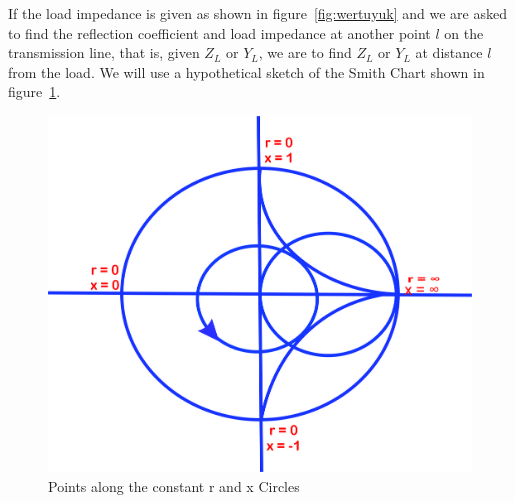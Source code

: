 If the load impedance is given as shown in figure~\ref{fig:wertuyuk} and we are asked to find the reflection coefficient and load impedance at another point $l$ on the transmission line, that is, given $Z_L$ or $Y_L$, we are to find $Z_L$ or $Y_L$ at distance $l$ from the load. We will use a hypothetical sketch of the Smith Chart shown in figure~\ref{fig:uytrewsxcvbj}.
\begin{figure}[h]
\centering
\includegraphics[width=0.9\linewidth]{./graphics/uytrewsxcvbj}
\caption{Points along the constant r and x Circles}
\label{fig:uytrewsxcvbj}
\end{figure}

